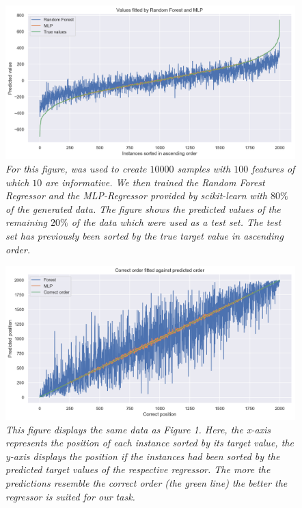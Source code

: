 	\begin{figure}[h]
		\centering
		\includegraphics[width=\linewidth]{images/mlp_forest_comparison01.png}
		\caption{\textit{For this figure, {\normalfont {}} was used to create $10000$ samples with $100$ features of which $10$ are informative. We then trained the Random Forest Regressor and the MLP-Regressor provided by {\normalfont scikit-learn} with $80\%$ of the generated data. The figure shows the predicted values of the remaining $20\%$ of the data which were used as a test set. The test set has previously been sorted by the true target value in ascending order.}}
		\label{forest_mlp_comp1}
	\end{figure}
	\begin{figure}[h]
		\centering
		\includegraphics[width=\linewidth]{images/mlp_forest_comparison02.png}
		\caption{\textit{This figure displays the same data as Figure 1. Here, the x-axis represents the position of each instance sorted by its target value, the y-axis displays the position if the instances had been sorted by the predicted target values of the respective regressor. The more the predictions resemble the correct order (the green line) the better the regressor is suited for our task.}}
		\label{forest_mlp_comp2}
	\end{figure}

